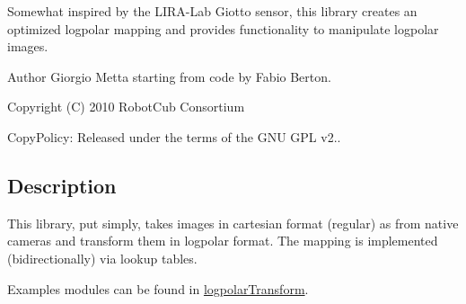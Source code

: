 Somewhat inspired by the L\+I\+R\+A-\/\+Lab Giotto sensor, this library creates an optimized logpolar mapping and provides functionality to manipulate logpolar images.

\begin{DoxyAuthor}{Author}
Giorgio Metta starting from code by Fabio Berton.
\end{DoxyAuthor}
Copyright (C) 2010 Robot\+Cub Consortium

Copy\+Policy\+: Released under the terms of the G\+N\+U G\+P\+L v2..\hypertarget{group__icub__logpolarRemapper_intro_sec}{}\subsection{Description}\label{group__icub__logpolarRemapper_intro_sec}
This library, put simply, takes images in cartesian format (regular) as from native cameras and transform them in logpolar format. The mapping is implemented (bidirectionally) via lookup tables.

Examples modules can be found in \hyperlink{group__icub__logpolarTransform}{logpolar\+Transform}. 